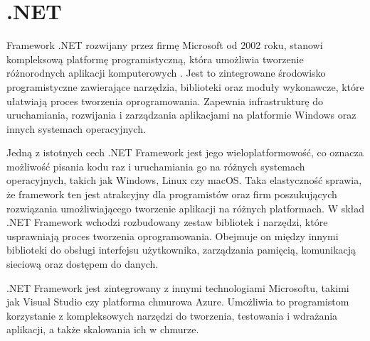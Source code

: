 \section{.NET}

Framework .NET rozwijany przez firmę Microsoft od 2002 roku, stanowi kompleksową platformę programistyczną, która umożliwia tworzenie różnorodnych aplikacji komputerowych \cite{microsoftNETBuild}.
Jest to zintegrowane środowisko programistyczne zawierające narzędzia, biblioteki oraz moduły wykonawcze, które ułatwiają proces tworzenia oprogramowania.
Zapewnia infrastrukturę do uruchamiania, rozwijania i zarządzania aplikacjami na platformie Windows oraz innych systemach operacyjnych.

Jedną z istotnych cech .NET Framework jest jego wieloplatformowość, co oznacza możliwość pisania kodu raz i uruchamiania go na różnych systemach operacyjnych, takich jak Windows, Linux czy macOS.
Taka elastyczność sprawia, że framework ten jest atrakcyjny dla programistów oraz firm poszukujących rozwiązania umożliwiającego tworzenie aplikacji na różnych platformach.
W skład .NET Framework wchodzi rozbudowany zestaw bibliotek i narzędzi, które usprawniają proces tworzenia oprogramowania.
Obejmuje on między innymi biblioteki do obsługi interfejsu użytkownika, zarządzania pamięcią, komunikacją sieciową oraz dostępem do danych.

.NET Framework jest zintegrowany z innymi technologiami Microsoftu, takimi jak Visual Studio czy platforma chmurowa Azure.
Umożliwia to programistom korzystanie z kompleksowych narzędzi do tworzenia, testowania i wdrażania aplikacji, a także skalowania ich w chmurze.